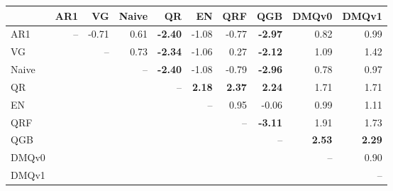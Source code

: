 \begin{tabular}{lrrrrrrrrr}
\toprule
 & AR1 & VG & Naive & QR & EN & QRF & QGB & DMQv0 & DMQv1 \\
\midrule
AR1 & -- & -0.71 & 0.61 & \textbf{-2.40} & -1.08 & -0.77 & \textbf{-2.97} & 0.82 & 0.99 \\
VG &  & -- & 0.73 & \textbf{-2.34} & -1.06 & 0.27 & \textbf{-2.12} & 1.09 & 1.42 \\
Naive &  &  & -- & \textbf{-2.40} & -1.08 & -0.79 & \textbf{-2.96} & 0.78 & 0.97 \\
QR &  &  &  & -- & \textbf{2.18} & \textbf{2.37} & \textbf{2.24} & 1.71 & 1.71 \\
EN &  &  &  &  & -- & 0.95 & -0.06 & 0.99 & 1.11 \\
QRF &  &  &  &  &  & -- & \textbf{-3.11} & 1.91 & 1.73 \\
QGB &  &  &  &  &  &  & -- & \textbf{2.53} & \textbf{2.29} \\
DMQv0 &  &  &  &  &  &  &  & -- & 0.90 \\
DMQv1 &  &  &  &  &  &  &  &  & -- \\
\bottomrule
\end{tabular}
